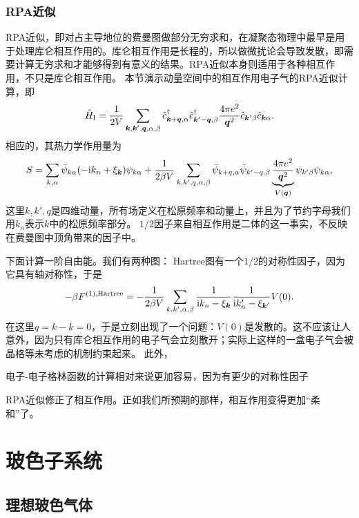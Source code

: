 \documentclass[hyperref, UTF8, a4paper]{ctexart}
\newcommand*{\ii}{\mathrm{i}}
\begin{document}
\subsubsection{RPA近似}

RPA近似，即对占主导地位的费曼图做部分无穷求和，在凝聚态物理中最早是用于处理库仑相互作用的。库仑相互作用是长程的，所以做微扰论会导致发散，即需要计算无穷求和才能够得到有意义的结果。RPA近似本身则适用于各种相互作用，不只是库仑相互作用。
本节演示动量空间中的相互作用电子气的RPA近似计算，即
\begin{equation}
    \hat{H}_\text{I} = \frac{1}{2V} \sum_{\vb*{k}, \vb*{k}', \vb*{q}, \alpha, \beta} \hat{c}^\dagger_{\vb*{k}+\vb*{q}, \alpha} \hat{c}^\dagger_{\vb*{k}'-\vb*{q}, \beta} \frac{4\pi e^2}{\vb*{q}^2} \hat{c}_{\vb*{k}' \beta} \hat{c}_{\vb*{k} \alpha}.
\end{equation}
相应的，其热力学作用量为
\begin{equation}
    S = \sum_{k, \alpha} \bar{\psi}_{k \alpha} (-\ii k_n + \xi_{\vb*{k}}) \psi_{k \alpha} + \frac{1}{2 \beta V} \sum_{k, k', q, \alpha, \beta} \bar{\psi}_{k+q, \alpha} \bar{\psi}_{k'-q, \beta} \underbrace{\frac{4\pi e^2}{\vb*{q}^2}}_{V(\vb*{q})} \psi_{k' \beta} \psi_{k \alpha},
\end{equation}
这里$k, k', q$是四维动量，所有场定义在松原频率和动量上，并且为了节约字母我们用$k_n$表示$k$中的松原频率部分。
$1/2$因子来自相互作用是二体的这一事实，不反映在费曼图中顶角带来的因子中。

下面计算一阶自由能。我们有两种图：
Hartree图有一个$1/2$的对称性因子，因为它具有轴对称性，于是
\[
    - \beta F^{(1),\text{Hartree}} = - \frac{1}{2 \beta V} \sum_{k, k', \alpha, \beta} \frac{1}{\ii k_n - \xi_{\vb*{k}}} \frac{1}{\ii k'_n - \xi_{\vb*{k}'}} V(0) .
\]
在这里$q=k-k=0$，于是立刻出现了一个问题：$V(0)$是发散的。这不应该让人意外，因为只有库仑相互作用的电子气会立刻散开；实际上这样的一盒电子气会被晶格等未考虑的机制约束起来。
此外，

电子-电子格林函数的计算相对来说更加容易，因为有更少的对称性因子

RPA近似修正了相互作用。正如我们所预期的那样，相互作用变得更加“柔和”了。

\section{玻色子系统}

\subsection{理想玻色气体}
\end{document}
